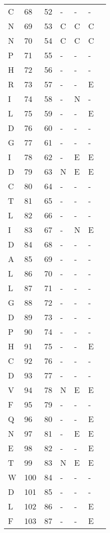 \begin{longtable}{lllllll}
  C &  68 & 52 & - & - & - &  \\ 
  N &  69 & 53 & C & C & C &  \\ 
  N &  70 & 54 & C & C & C &  \\ 
  P &  71 & 55 & - & - & - &  \\ 
  H &  72 & 56 & - & - & - &  \\ 
  R &  73 & 57 & - & - & E &  \\ 
  I &  74 & 58 & - & N & - &  \\ 
  L &  75 & 59 & - & - & E &  \\ 
  D &  76 & 60 & - & - & - &  \\ 
  G &  77 & 61 & - & - & - &  \\ 
  I &  78 & 62 & - & E & E &  \\ 
  D &  79 & 63 & N & E & E &  \\ 
  C &  80 & 64 & - & - & - &  \\ 
  T &  81 & 65 & - & - & - &  \\ 
  L &  82 & 66 & - & - & - &  \\ 
  I &  83 & 67 & - & N & E &  \\ 
  D &  84 & 68 & - & - & - &  \\ 
  A &  85 & 69 & - & - & - &  \\ 
  L &  86 & 70 & - & - & - &  \\ 
  L &  87 & 71 & - & - & - &  \\ 
  G &  88 & 72 & - & - & - &  \\ 
  D &  89 & 73 & - & - & - &  \\ 
  P &  90 & 74 & - & - & - &  \\ 
  H &  91 & 75 & - & - & E &  \\ 
  C &  92 & 76 & - & - & - &  \\ 
  D &  93 & 77 & - & - & - &  \\ 
  V &  94 & 78 & N & E & E &  \\ 
  F &  95 & 79 & - & - & - &  \\ 
  Q &  96 & 80 & - & - & E &  \\ 
  N &  97 & 81 & - & E & E &  \\ 
  E &  98 & 82 & - & - & E &  \\ 
  T &  99 & 83 & N & E & E &  \\ 
  W & 100 & 84 & - & - & - &  \\ 
  D & 101 & 85 & - & - & - &  \\ 
  L & 102 & 86 & - & - & E &  \\ 
  F & 103 & 87 & - & - & E &  \\ 

\end{longtable}
